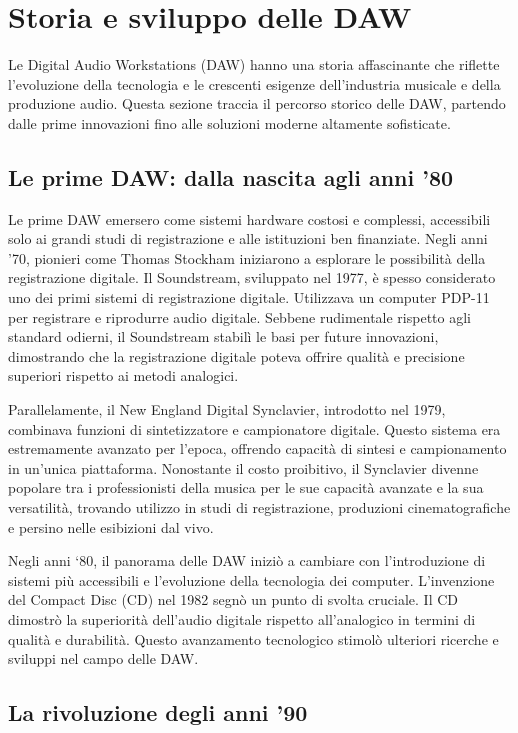 \documentclass{book}
\begin{document}
\section{Storia e sviluppo delle DAW}

Le Digital Audio Workstations (DAW) hanno una storia affascinante che riflette l’evoluzione della tecnologia e le crescenti esigenze dell’industria musicale e della produzione audio. Questa sezione traccia il percorso storico delle DAW, partendo dalle prime innovazioni fino alle soluzioni moderne altamente sofisticate.

\subsection{Le prime DAW: dalla nascita agli anni ’80}

Le prime DAW emersero come sistemi hardware costosi e complessi, accessibili solo ai grandi studi di registrazione e alle istituzioni ben finanziate. Negli anni ’70, pionieri come Thomas Stockham iniziarono a esplorare le possibilità della registrazione digitale. Il Soundstream, sviluppato nel 1977, è spesso considerato uno dei primi sistemi di registrazione digitale. Utilizzava un computer PDP-11 per registrare e riprodurre audio digitale. Sebbene rudimentale rispetto agli standard odierni, il Soundstream stabilì le basi per future innovazioni, dimostrando che la registrazione digitale poteva offrire qualità e precisione superiori rispetto ai metodi analogici.

Parallelamente, il New England Digital Synclavier, introdotto nel 1979, combinava funzioni di sintetizzatore e campionatore digitale. Questo sistema era estremamente avanzato per l’epoca, offrendo capacità di sintesi e campionamento in un’unica piattaforma. Nonostante il costo proibitivo, il Synclavier divenne popolare tra i professionisti della musica per le sue capacità avanzate e la sua versatilità, trovando utilizzo in studi di registrazione, produzioni cinematografiche e persino nelle esibizioni dal vivo.

Negli anni ‘80, il panorama delle DAW iniziò a cambiare con l’introduzione di sistemi più accessibili e l’evoluzione della tecnologia dei computer. L’invenzione del Compact Disc (CD) nel 1982 segnò un punto di svolta cruciale. Il CD dimostrò la superiorità dell’audio digitale rispetto all’analogico in termini di qualità e durabilità. Questo avanzamento tecnologico stimolò ulteriori ricerche e sviluppi nel campo delle DAW.

\subsection{La rivoluzione degli anni ’90}
\end{document}
